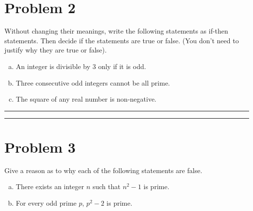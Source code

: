 \documentclass{article}
\theoremstyle{definition}
\newenvironment{solution}{\bigskip\hrule{\hfill}}{\bigskip\hrule{\hfill}} %
\begin{document}
\section*{Problem 2}

Without changing their meanings, write the following statements as if-then statements. Then decide if the statements are true or false. (You don't need to justify why they are true or false).

\begin{enumerate}[a)] %
    \item An integer is divisible by $3$ only if it is odd.

    \item Three consecutive odd integers cannot be all prime.

    \item The square of any real number is non-negative.
\end{enumerate}

\begin{solution}


\end{solution}


\newpage


\section*{Problem 3}

Give a reason as to why each of the following statements are false.

\begin{enumerate}[a)] %
    \item There exists an integer $n$ such that $n^2-1$ is prime.
    
    \item For every odd prime $p$, $p^2-2$ is prime.
\end{enumerate}
\end{document}
